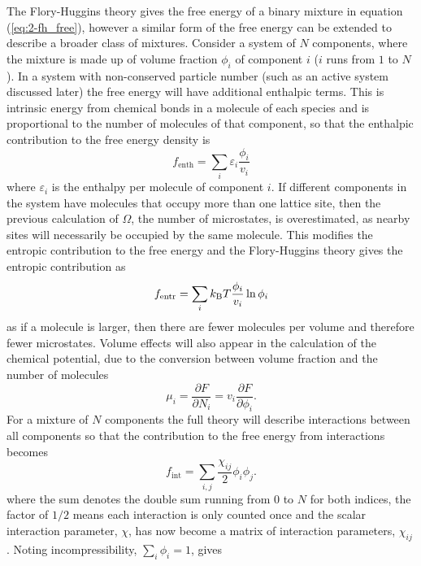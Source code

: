 The Flory-Huggins theory gives the free energy of a binary mixture in equation (\ref{eq:2-fh_free}), however a similar form of the free energy can be extended to describe a broader class of mixtures. Consider a system of $N$ components, where the mixture is made up of volume fraction $\phi_i$ of component $i$ ($i$ runs from $1$ to $N$). In a system with non-conserved particle number (such as an active system discussed later) the free energy will have additional enthalpic terms. This is intrinsic energy from chemical bonds in a molecule of each species and is proportional to the number of molecules of that component, so that the enthalpic contribution to the free energy density is
\begin{equation}
    f_\text{enth} = \sum_{i}\varepsilon_i \frac{\phi_i}{v_i}
\end{equation}
where $\varepsilon_i$ is the enthalpy per molecule of component $i$. If different components in the system have molecules that occupy more than one lattice site, then the previous calculation of $\Omega$, the number of microstates, is overestimated, as nearby sites will necessarily be occupied by the same molecule. This modifies the entropic contribution to the free energy and the Flory-Huggins theory gives the entropic contribution as
\begin{equation}
    f_\text{entr} = \sum_{i}k_{\rm B} T \frac{\phi_i}{v_i}\ln\phi_i
\end{equation}
as if a molecule is larger, then there are fewer  molecules per volume and therefore fewer microstates. Volume effects will also appear in the calculation of the chemical potential, due to the conversion between volume fraction and the number of molecules
\begin{equation}
    \mu_i = \frac{\partial F}{\partial N_i} = v_i\frac{\partial F}{\partial \phi_i}.
\end{equation}
For a mixture of $N$ components the full theory will describe interactions between all components so that the contribution to the free energy from interactions becomes
\begin{equation}
    f_\text{int} = \sum_{i, j}\frac{\chi_{ij}}{2}\phi_i\phi_j.
\end{equation}
where the sum denotes the double sum running from $0$ to $N$ for both indices, the factor of $1/2$ means each interaction is only counted once and the scalar interaction parameter, $\chi$, has now become a matrix of interaction parameters, $\chi_{ij}$ \cite{mao_phase_2019}. Noting incompressibility, $\sum_{i}\phi_i = 1$, gives
